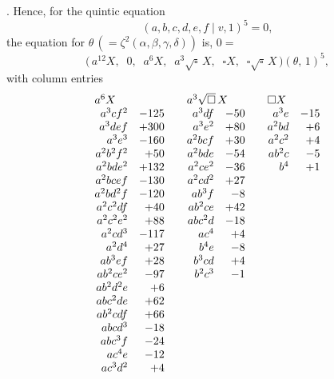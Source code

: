 \documentclass[11pt]{article}
\newcommand{\Cdel}{\mid}
\begin{document}
. Hence, for the quintic equation
\[
   (a, b, c, d, e, f \Cdel v, 1)^5 = 0,
\]
the equation for $\theta\,(=\zeta^2(\alpha, \beta, \gamma, \delta))$ is, $0 =$
\[
\bigl(\,a^{12}X,\;\;0,\;\;a^6X,\;\;a^3\sqrt{\square}\,X,\;\;\square X,\;\;\square\sqrt{\square}\,X\,\bigr)(\theta,\,1)^5,
\]
with column entries
\[
\begin{array}{rrcrrcrr}
\multicolumn{2}{l}{a^6 X} & & \multicolumn{2}{l}{a^3\sqrt{\square}\,X} & & \multicolumn{2}{l}{\square X}\\
a^3 c f^2       & -125 & & a^3 d f       & -50 & & a^3 e     & -15\\
a^3 d e f       & +300 & & a^3 e^2       & +80 & & a^2 b d   & +6\\
a^3 e^3         & -160 & & a^2 b c f     & +30 & & a^2 c^2   & +4\\
a^2 b^2 f^2     & +50  & & a^2 b d e     & -54 & & a b^2 c   & -5\\
a^2 b d e^2     & +132 & & a^2 c e^2     & -36 & & b^4       & +1\\
a^2 b c e f     & -130 & & a^2 c d^2     & +27 & &           &\\
a^2 b d^2 f     & -120 & & a b^3 f       & -8  & &           &\\
a^2 c^2 d f     & +40  & & a b^2 c e     & +42 & &           &\\
a^2 c^2 e^2     & +88  & & a b c^2 d     & -18 & &           &\\
a^2 c d^3       & -117 & & a c^4         & +4  & &           &\\
a^2 d^4         & +27  & & b^4 e         & -8  & &           &\\
a b^3 e f       & +28  & & b^3 c d       & +4  & &           &\\
a b^2 c e^2     & -97  & & b^2 c^3       & -1  & &           &\\
a b^2 d^2 e     & +6   & &                &     & &           &\\
a b c^2 d e     & +62  & &                &     & &           &\\
a b^2 c d f     & +66  & &                &     & &           &\\
a b c d^3       & -18  & &                &     & &           &\\
a b c^3 f       & -24  & &                &     & &           &\\
a c^4 e         & -12  & &                &     & &           &\\
a c^3 d^2       & +4   & &                &     & &           &\\

\end{array}\]
\end{document}
